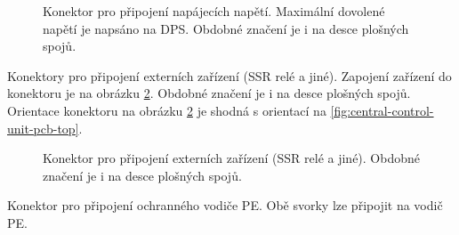 \begin{Czech}
\begin{figure}[H]
    \centering
    \def\svgwidth{0.15\columnwidth}
    \graphicspath{{pictures/all/hardware/svg/}}
    
    \caption{Konektor pro připojení napájecích napětí. Maximální dovolené napětí je napsáno na DPS. Obdobné značení je i na desce plošných spojů.}
    \label{fig:central-control-unit-terminal-blocks-power-supply}
\end{figure}
\end{Czech}

\begin{Czech}
\end{Czech}

\begin{Czech}
\end{Czech}

\begin{Czech}
Konektory pro připojení externích zařízení (SSR relé a jiné).  Zapojení zařízení do konektoru je na obrázku \ref{fig:central-control-unit-terminal-block-relays}. Obdobné značení je i na desce plošných spojů. Orientace konektoru na obrázku \ref{fig:central-control-unit-terminal-block-relays} je shodná s orientací na \ref{fig:central-control-unit-pcb-top}.
\end{Czech}

\begin{Czech}
\begin{figure}[H]
    \centering
    \def\svgwidth{0.15\columnwidth}
    \graphicspath{{pictures/all/hardware/svg/}}
    
    \caption{Konektor pro připojení externích zařízení (SSR relé a jiné). Obdobné značení je i na desce plošných spojů.}
    \label{fig:central-control-unit-terminal-block-relays}
\end{figure}
\end{Czech}

\begin{Czech}
\end{Czech}

\begin{Czech}
Konektor pro připojení ochranného vodiče PE. Obě svorky lze připojit na vodič PE.
\end{Czech}

\begin{Czech}
\end{Czech}

